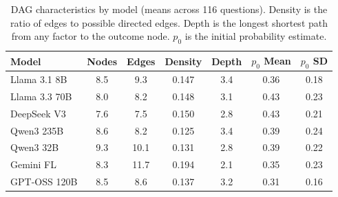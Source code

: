 \begin{table}[t]
\centering
\small
\begin{tabular}{lcccccc}
\toprule
\textbf{Model} & \textbf{Nodes} & \textbf{Edges} & \textbf{Density} & \textbf{Depth} & \textbf{$p_0$ Mean} & \textbf{$p_0$ SD} \\
\midrule
Llama 3.1 8B & 8.5 & 9.3 & 0.147 & 3.4 & 0.36 & 0.18 \\
Llama 3.3 70B & 8.0 & 8.2 & 0.148 & 3.1 & 0.43 & 0.23 \\
DeepSeek V3 & 7.6 & 7.5 & 0.150 & 2.8 & 0.43 & 0.21 \\
Qwen3 235B & 8.6 & 8.2 & 0.125 & 3.4 & 0.39 & 0.24 \\
Qwen3 32B & 9.3 & 10.1 & 0.131 & 2.8 & 0.39 & 0.22 \\
Gemini FL & 8.3 & 11.7 & 0.194 & 2.1 & 0.35 & 0.23 \\
GPT-OSS 120B & 8.5 & 8.6 & 0.137 & 3.2 & 0.31 & 0.16 \\
\bottomrule
\end{tabular}
\caption{DAG characteristics by model (means across 116 questions). Density is the ratio of edges to possible directed edges. Depth is the longest shortest path from any factor to the outcome node. $p_0$ is the initial probability estimate.}
\label{tab:dag_characteristics}
\end{table}